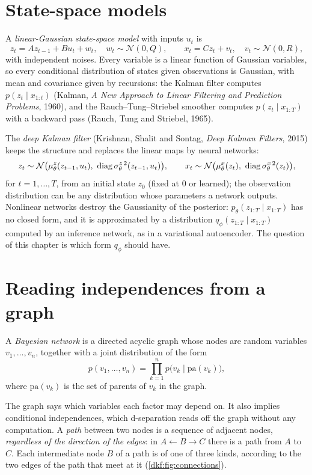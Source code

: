 \begin{notechapter}
\section{State-space models}\label{dkf:sec:ssm}

A \emph{linear-Gaussian state-space model} with inputs $u_t$ is
\[
  z_t = Az_{t-1} + Bu_t + w_t,\quad w_t\sim\mathcal N(0, Q),\qquad
  x_t = Cz_t + v_t,\quad v_t\sim\mathcal N(0, R),
\]
with independent noises. Every variable is a linear function of Gaussian variables, so every
conditional distribution of states given observations is Gaussian, with mean and
covariance given by recursions: the Kalman filter computes $p(z_t\mid x_{1:t})$ (Kalman, \emph{A New Approach
to Linear Filtering and Prediction Problems}, 1960), and the Rauch--Tung--Striebel smoother
computes $p(z_t\mid x_{1:T})$ with a backward pass (Rauch, Tung and Striebel, 1965).

The \emph{deep Kalman filter} (Krishnan, Shalit and Sontag, \emph{Deep Kalman Filters}, 2015) keeps
the structure and replaces the linear maps by neural networks:
\[
  z_t\sim\mathcal N\bigl(\mu^z_\theta(z_{t-1}, u_t),\ \diag\sigma^{z\,2}_\theta(z_{t-1}, u_t)\bigr),\qquad
  x_t\sim\mathcal N\bigl(\mu^x_\theta(z_t),\ \diag\sigma^{x\,2}_\theta(z_t)\bigr),
\]
for $t = 1,\dots,T$, from an initial state $z_0$ (fixed at $0$ or learned); the observation distribution can be
any distribution whose parameters a network outputs. Nonlinear networks destroy the
Gaussianity of the posterior: $p_\theta(z_{1:T}\mid x_{1:T})$ has no closed form, and it is approximated by a
distribution $q_\phi(z_{1:T}\mid x_{1:T})$ computed by an inference network, as in a variational autoencoder.
The question of this chapter is which form $q_\phi$ should have.

\section{Reading independences from a graph}\label{dkf:sec:dseparation}

\begin{definition}\label{dkf:def:bn}
A \emph{Bayesian network} is a directed acyclic graph whose nodes are random variables
$v_1,\dots,v_n$, together with a joint distribution of the form
\[
  p(v_1,\dots,v_n) = \prod_{k=1}^np\bigl(v_k\mid\mathrm{pa}(v_k)\bigr),
\]
where $\mathrm{pa}(v_k)$ is the set of parents of $v_k$ in the graph.
\end{definition}

The graph says which variables each factor may depend on. It also implies conditional
independences, which d-separation reads off the graph without any computation. A
\emph{path} between two nodes is a sequence of adjacent nodes, \emph{regardless of the direction of the
edges}: in $A\leftarrow B\to C$ there is a path from $A$ to $C$. Each intermediate node $B$ of a path is of one of three
kinds, according to the two edges of the path that meet at it (\cref{dkf:fig:connections}).


\end{notechapter}
